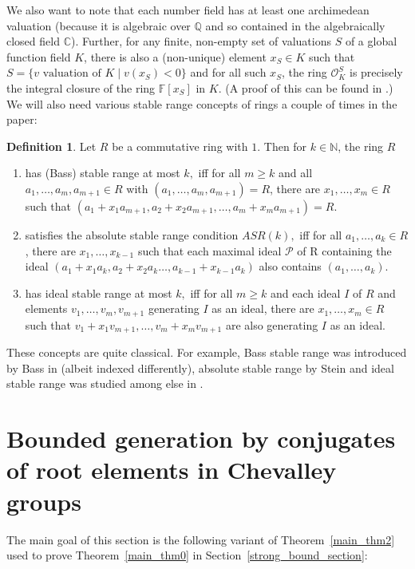 \documentclass[12pt]{amsart}
\newcommand{\C}[1]{{\mathcal #1}}
\theoremstyle{definition}\newtheorem{definition}[theorem]{Definition}
\theoremstyle{remark}\newtheorem{remark}[theorem]{Remark}
\theoremstyle{definition}\newtheorem{case}{Case}
\begin{document}
We also want to note that each number field has at least one archimedean valuation (because it is algebraic over $\mathbb{Q}$ and so contained in the algebraically closed field $\mathbb{C}$). Further, for any finite, non-empty set of valuations $S$ of a global function field $K$, there is also a (non-unique) element $x_S\in K$ such that $S=\{v\text{ valuation of }K\mid v(x_S)<0\}$ and for all such $x_S$, the ring $\mathscr{O}_K^S$ is precisely the integral closure of the ring $\mathbb{F}[x_S]$ in $K.$ (A proof of this can be found in \cite[Theorem~14.5]{MR1876657}.)
We will also need various stable range concepts of rings a couple of times in the paper:

\begin{definition}\label{stability_conditions}
Let $R$ be a commutative ring with $1.$ Then for $k\in\mathbb{N}$, the ring $R$
\begin{enumerate}
\item has (Bass) stable range at most $k,$ iff for all $m\geq k$ and all $a_1,\dots,a_m,a_{m+1}\in R$ with $(a_1,\dots,a_m,a_{m+1})=R$, there are $x_1,\dots,x_m\in R$ such that $(a_1+x_1a_{m+1},a_2+x_2a_{m+1},\dots,a_m+x_ma_{m+1})=R.$ 
\item satisfies the absolute stable range condition $ASR(k),$ iff for all $a_1,\dots,a_k\in R$, there are $x_1,\dots,x_{k-1}$ such that each maximal ideal $\C P$ of R containing the ideal $(a_1+x_1a_k,a_2+x_2a_k\dots,a_{k-1}+x_{k-1}a_k)$ also contains $(a_1,\dots,a_k).$
\item has ideal stable range at most $k,$ iff for all $m\geq k$ and each ideal $I$ of $R$ and elements $v_1,\dots,v_m,v_{m+1}$ generating $I$ as an ideal, there are $x_1,\dots,x_m\in R$ such that $v_1+x_1v_{m+1},\dots,v_m+x_mv_{m+1}$ are also generating $I$ as an ideal.
\end{enumerate}
\end{definition}

These concepts are quite classical. For example, Bass stable range was introduced by Bass in \cite{MR0174604} (albeit indexed differently), absolute stable range by Stein \cite{197877} and ideal stable range was studied among else in \cite{stepanov1989stable}. 

\section{Bounded generation by conjugates of root elements in Chevalley groups}

The main goal of this section is the following variant of Theorem~\ref{main_thm2} used to prove Theorem~\ref{main_thm0} in Section~\ref{strong_bound_section}:
\end{document}
